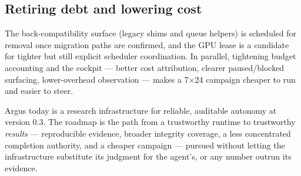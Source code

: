 \subsection{Retiring debt and lowering cost}

The back-compatibility surface (legacy shims and queue helpers) is scheduled for
removal once migration paths are confirmed,
and the GPU lease is a candidate for tighter but still explicit scheduler
coordination. In parallel, tightening budget accounting and the cockpit --- better
cost attribution, clearer paused/blocked surfacing, lower-overhead observation ---
makes a 7$\times$24 campaign cheaper to run and easier to steer.

\begin{callout}
Argus today is a research infrastructure for reliable, auditable autonomy at
version 0.3. The roadmap is the path from a trustworthy runtime to trustworthy
\emph{results} --- reproducible evidence, broader integrity coverage, a less
concentrated completion authority, and a cheaper campaign --- pursued without
letting the infrastructure substitute its judgment for the agent's, or any number
outrun its evidence.
\end{callout}

